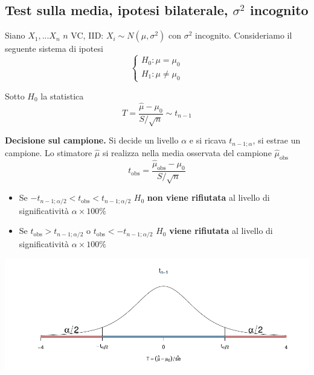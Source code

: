 \documentclass[
  11pt,
]{book}
\providecommand{\tightlist}{%
  \setlength{\itemsep}{0pt}\setlength{\parskip}{0pt}}
\theoremstyle{mytheoremstyle}
\theoremstyle{mydefstyle}
\begin{document}
\subsection{\texorpdfstring{Test sulla media, ipotesi bilaterale, \(\sigma^2\) incognito}{Test sulla media, ipotesi bilaterale, \textbackslash sigma\^{}2 incognito}}\label{test-sulla-media-ipotesi-bilaterale-sigma2-incognito}

Siano \(X_1,...X_n\) \(n\) VC, IID: \(X_i\sim N(\mu,\sigma^2)\) con \(\sigma^2\)
incognito. Consideriamo il seguente sistema di ipotesi \[\begin{cases}
H_0:\mu=\mu_0\\
H_1:\mu\neq\mu_0
\end{cases}\]

Sotto \(H_0\) la statistica
\[T=\frac{\hat \mu-\mu_0}{S/\sqrt n}\sim t_{n-1}\]

\begin{info}

\textbf{Decisione sul campione.} Si decide un livello \(\alpha\) e si ricava
\(t_{n-1;\alpha}\), si estrae un campione. Lo stimatore \(\hat\mu\) si
realizza nella media osservata del campione \(\hat\mu_\text{obs}\)
\[t_{\text{obs}}=\frac{\hat\mu_\text{obs} -\mu_0}{S/\sqrt n}\]

\begin{itemize}
\tightlist
\item
  Se \(-t_{n-1;\alpha/2}<t_{\text{obs}}<t_{n-1;\alpha/2}\) \(H_0\) \textbf{non
  viene rifiutata} al livello di significatività \(\alpha\times100\%\)
\item
  Se \(t_{\text{obs}}>t_{n-1;\alpha/2}\) o
  \(t_{\text{obs}}<-t_{n-1;\alpha/2}\) \(H_0\) \textbf{viene rifiutata} al
  livello di significatività \(\alpha\times100\%\)
\end{itemize}

\begin{center}\includegraphics{Appunti_di_Statistica_2025_files/figure-latex/15-test-mu-pi-24-1} \end{center}

\end{info}
\end{document}
